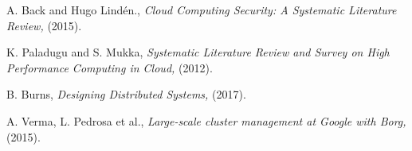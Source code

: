 \documentclass[11pt,twoside]{article}
\begin{document}
\begin{thebibliography}{99}

 A. Back and Hugo Lindén., {\it Cloud Computing Security: A Systematic Literature Review,} (2015).

 K. Paladugu and S. Mukka, {\it Systematic Literature Review and Survey on High Performance Computing in Cloud,} (2012).

 B. Burns, {\it Designing Distributed Systems,} (2017).

 A. Verma, L. Pedrosa  et al., {\it Large-scale cluster management at Google with Borg,} (2015).

\end{thebibliography}
\end{document}
